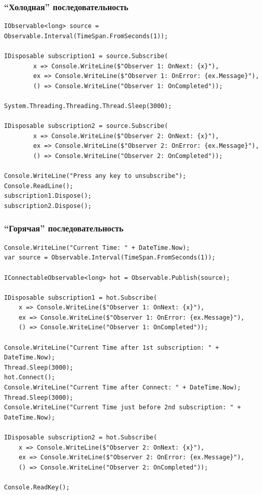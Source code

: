 \documentclass[xetex,mathserif,serif]{beamer}
\begin{document}
	\begin{frame}[fragile]
		\frametitle{``Холодная'' последовательность}
		\begin{footnotesize}
			\begin{verbatim}
IObservable<long> source = Observable.Interval(TimeSpan.FromSeconds(1));   

IDisposable subscription1 = source.Subscribe(
        x => Console.WriteLine($"Observer 1: OnNext: {x}"),
        ex => Console.WriteLine($"Observer 1: OnError: {ex.Message}"),
        () => Console.WriteLine("Observer 1: OnCompleted"));

System.Threading.Threading.Thread.Sleep(3000);

IDisposable subscription2 = source.Subscribe(
        x => Console.WriteLine($"Observer 2: OnNext: {x}"),
        ex => Console.WriteLine($"Observer 2: OnError: {ex.Message}"),
        () => Console.WriteLine("Observer 2: OnCompleted"));

Console.WriteLine("Press any key to unsubscribe");
Console.ReadLine();
subscription1.Dispose();
subscription2.Dispose();
			\end{verbatim}
		\end{footnotesize}
	\end{frame}

	\begin{frame}[fragile]
		\frametitle{``Горячая'' последовательность}
		\begin{scriptsize}
			\begin{verbatim}
Console.WriteLine("Current Time: " + DateTime.Now);
var source = Observable.Interval(TimeSpan.FromSeconds(1));

IConnectableObservable<long> hot = Observable.Publish(source);

IDisposable subscription1 = hot.Subscribe(
    x => Console.WriteLine($"Observer 1: OnNext: {x}"),
    ex => Console.WriteLine($"Observer 1: OnError: {ex.Message}"),
    () => Console.WriteLine("Observer 1: OnCompleted"));

Console.WriteLine("Current Time after 1st subscription: " + DateTime.Now);
Thread.Sleep(3000);
hot.Connect();
Console.WriteLine("Current Time after Connect: " + DateTime.Now);
Thread.Sleep(3000);
Console.WriteLine("Current Time just before 2nd subscription: " + DateTime.Now);

IDisposable subscription2 = hot.Subscribe(
    x => Console.WriteLine($"Observer 2: OnNext: {x}"),
    ex => Console.WriteLine($"Observer 2: OnError: {ex.Message}"),
    () => Console.WriteLine("Observer 2: OnCompleted"));

Console.ReadKey();
			\end{verbatim}
		\end{scriptsize}
	\end{frame}
\end{document}
